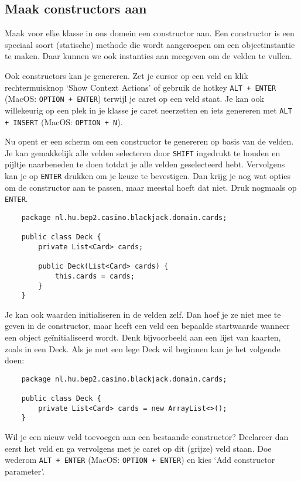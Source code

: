 \subsection{Maak constructors aan}
Maak voor elke klasse in ons domein een constructor aan.
Een constructor is een speciaal soort (statische) methode die wordt aangeroepen
om een objectinstantie te maken. Daar kunnen we ook instanties aan meegeven om 
de velden te vullen.

Ook constructors kan je genereren. Zet je cursor op een veld en klik 
rechtermuisknop `Show Context Actions' of gebruik de hotkey \texttt{ALT + ENTER} 
(MacOS: \texttt{OPTION + ENTER}) terwijl je caret op een veld staat. 
Je kan ook willekeurig op een plek in je klasse je caret neerzetten en iets genereren 
met \texttt{ALT + INSERT} (MacOS: \texttt{OPTION + N}).

Nu opent er een scherm om een constructor te genereren op basis van de velden. Je kan 
gemakkelijk alle velden selecteren door \texttt{SHIFT} ingedrukt te houden en 
pijltje naarbeneden te doen totdat je alle velden geselecteerd hebt. Vervolgens kan je 
op \texttt{ENTER} drukken om je keuze te bevestigen. Dan krijg je nog wat opties om de 
constructor aan te passen, maar meestal hoeft dat niet. Druk nogmaals op \texttt{ENTER}.

\begin{verbatim}
    package nl.hu.bep2.casino.blackjack.domain.cards;

    public class Deck {
        private List<Card> cards;

        public Deck(List<Card> cards) {
            this.cards = cards;
        }
    }
\end{verbatim}

Je kan ook waarden initialiseren in de velden zelf. Dan hoef je ze niet mee te geven 
in de constructor, maar heeft een veld een bepaalde startwaarde wanneer een object 
geïnitialiseerd wordt. Denk bijvoorbeeld aan een lijst van kaarten, zoals in een Deck.
Als je met een lege Deck wil beginnen kan je het volgende doen:

\begin{verbatim}
    package nl.hu.bep2.casino.blackjack.domain.cards;

    public class Deck {
        private List<Card> cards = new ArrayList<>();
    }
\end{verbatim}

Wil je een nieuw veld toevoegen aan een bestaande constructor? Declareer dan eerst het veld
en ga vervolgens met je caret op dit (grijze) veld staan. 
Doe wederom \texttt{ALT + ENTER} (MacOS: \texttt{OPTION + ENTER})
en kies `Add constructor parameter'.

